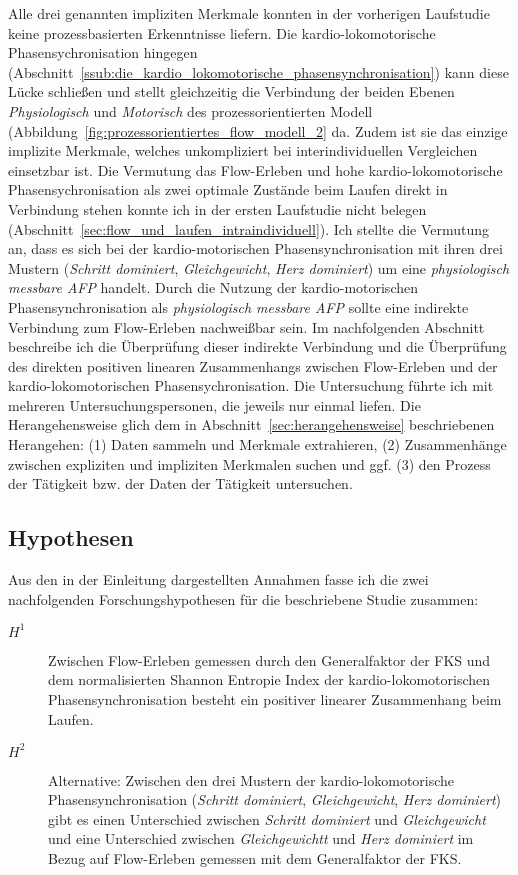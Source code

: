 Alle drei genannten impliziten Merkmale konnten in der vorherigen Laufstudie keine prozessbasierten Erkenntnisse liefern. Die kardio-lokomotorische Phasensychronisation hingegen (Abschnitt~\ref{ssub:die_kardio_lokomotorische_phasensynchronisation}) kann diese Lücke schließen und stellt gleichzeitig die Verbindung der beiden Ebenen \emph{Physiologisch} und \emph{Motorisch} des prozessorientierten Modell (Abbildung~\ref{fig:prozessorientiertes_flow_modell_2} da. Zudem ist sie das einzige implizite Merkmale, welches unkompliziert bei interindividuellen Vergleichen einsetzbar ist. Die Vermutung das Flow-Erleben und hohe kardio-lokomotorische Phasensychronisation als zwei optimale Zustände beim Laufen direkt in Verbindung stehen konnte ich in der ersten Laufstudie nicht belegen (Abschnitt~\ref{sec:flow_und_laufen_intraindividuell}). Ich stellte die Vermutung an, dass es sich bei der kardio-motorischen Phasensynchronisation mit ihren drei Mustern (\emph{Schritt dominiert}, \emph{Gleichgewicht}, \emph{Herz dominiert}) um eine \emph{physiologisch messbare \ac{AFP}} handelt. Durch die Nutzung der kardio-motorischen Phasensynchronisation als \emph{physiologisch messbare \ac{AFP}} sollte eine indirekte Verbindung zum Flow-Erleben nachweißbar sein. Im nachfolgenden Abschnitt beschreibe ich die Überprüfung dieser indirekte Verbindung und die Überprüfung des direkten positiven linearen Zusammenhangs zwischen Flow-Erleben und der kardio-lokomotorischen Phasensychronisation. Die Untersuchung führte ich mit mehreren Untersuchungspersonen, die jeweils nur einmal liefen. Die Herangehensweise glich dem in Abschnitt~\ref{sec:herangehensweise} beschriebenen Herangehen: (1) Daten sammeln und Merkmale extrahieren, (2) Zusammenhänge zwischen expliziten und impliziten Merkmalen suchen und ggf. (3) den Prozess der Tätigkeit bzw. der Daten der Tätigkeit untersuchen. 

\subsection{Hypothesen} 

\label{sub:hypothesen}

Aus den in der Einleitung dargestellten Annahmen fasse ich die zwei nachfolgenden Forschungshypothesen für die beschriebene Studie zusammen: 
\begin{description}
	\item[$H^1$] Zwischen Flow-Erleben gemessen durch den Generalfaktor der \ac{FKS} und dem normalisierten Shannon Entropie Index der kardio-lokomotorischen Phasensynchronisation besteht ein positiver linearer Zusammenhang beim Laufen. 
	\item[$H^2$] Alternative: Zwischen den drei Mustern der kardio-lokomotorische Phasensynchronisation (\emph{Schritt dominiert}, \emph{Gleichgewicht}, \emph{Herz dominiert}) gibt es einen Unterschied zwischen \emph{Schritt dominiert} und \emph{Gleichgewicht} und eine Unterschied zwischen \emph{Gleichgewichtt} und \emph{Herz dominiert} im Bezug auf Flow-Erleben gemessen mit dem Generalfaktor der \ac{FKS}. 
\end{description}

